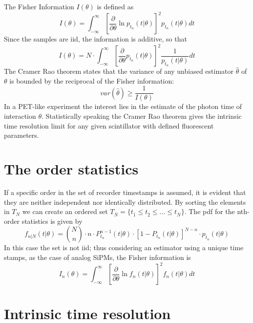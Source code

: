 The Fisher Information $I(\theta)$ is defined as
\begin{equation}
I(\theta) = \int _{-\infty} ^{\infty} \left[ \frac{\partial}{\partial \theta} \ln p_{t_{n}}(t|\theta) \right] ^{2} p_{t_{n}}(t|\theta)dt
\end{equation}
Since the samples are iid, the information is additive, so that
\begin{equation}
I(\theta) = N \cdot \int _{-\infty} ^{\infty} \left[ \frac{\partial}{\partial \theta} p_{t_{n}}(t|\theta) \right] ^{2} \frac{1}{p_{t_{n}}(t|\theta)}dt
\end{equation}
The Cramer Rao theorem states that the variance of any unbiased estimator $\hat{\theta}$ of $\theta$ is bounded by the reciprocal of the Fisher information:
\begin{equation}
var(\hat{\theta})\geq \frac{1}{I(\theta)}
\end{equation}
In a PET-like experiment the interest lies in the estimate of the photon time of interaction $\theta$.
Statistically speaking the Cramer Rao theorem gives the intrinsic time resolution limit for any given scintillator with defined fluorescent parameters.


\section{The order statistics}
If a specific order in the set of recorder timestamps is assumed, it is evident that they are neither independent nor identically distributed. By sorting the elements in $T_{N}$ we can create an ordered set $T_{\bar{N}} = \{ t_{\bar{1}} \leq t_{\bar{2}} \leq ... \leq t_{\bar{N}} \}$. The pdf for the nth-order statistics is given by \cite{Seifert2012}
\begin{equation}
f_{n|N} (t|\theta) = \binom{N}{n} \cdot n \cdot P_{t_{n}}^{n-1}(t|\theta) \cdot \left[ 1-P_{t_{n}}(t|\theta) \right] ^{N-n}\cdot p_{t_{n}} (t|\theta)
\end{equation}
In this case the set is not iid; thus considering an estimator using a unique time stamps, as the case of analog SiPMs, the Fisher information is
\begin{equation}
I_{n}(\theta) = \int _{-\infty} ^{\infty} \left[ \frac{\partial}{\partial \theta} \ln f_{n}(t|\theta) \right] ^{2} f_{n}(t|\theta)dt
\end{equation}
   
\section{Intrinsic time resolution}

